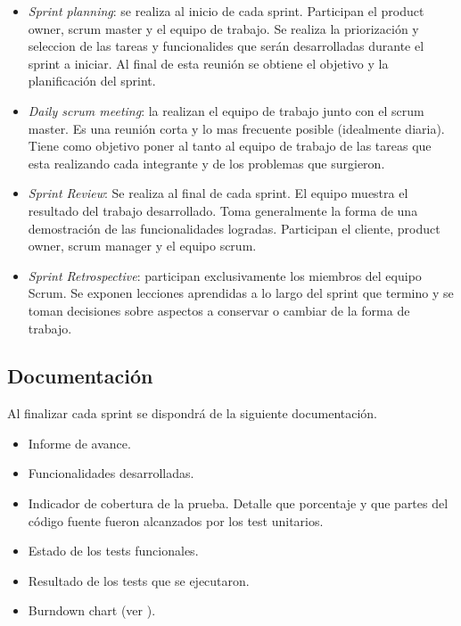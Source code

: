 \documentclass[12pt,a4paper]{article}
\begin{document}
	\begin{itemize}
	\item \textit{Sprint planning}: se realiza al inicio de cada sprint. Participan el product owner, scrum master y el equipo de trabajo. Se realiza la priorización y seleccion de las tareas y funcionalides que serán desarrolladas durante el sprint a iniciar. Al final de esta reunión se obtiene el objetivo y la planificación del sprint.

	\item \textit{Daily scrum meeting}: la realizan el equipo de trabajo junto con el scrum master. Es una reunión corta y lo mas frecuente posible (idealmente diaria).  Tiene como objetivo poner al tanto al equipo de trabajo de las tareas que esta realizando cada integrante y de los problemas que surgieron.

	\item \textit{Sprint Review}: Se realiza al final de cada sprint. El equipo muestra el resultado del trabajo desarrollado. Toma generalmente la forma de una demostración de las funcionalidades logradas. Participan el cliente, product owner, scrum manager y el equipo scrum.

	\item \textit{Sprint Retrospective}: participan exclusivamente los miembros del equipo Scrum. Se exponen lecciones aprendidas a lo largo del sprint que termino y se toman decisiones sobre aspectos a conservar o cambiar de la forma de trabajo.
	\end{itemize}


	\subsection{Documentación}
	Al finalizar cada sprint se dispondrá de la siguiente documentación.

	\begin{itemize}
		\item Informe de avance.
		\item Funcionalidades desarrolladas.
		\item Indicador de cobertura de la prueba. Detalle que porcentaje y que partes del código fuente fueron alcanzados por los test unitarios.
		\item Estado de los tests funcionales.
		\item Resultado de los tests que se ejecutaron.
		\item Burndown chart (ver \cite{burndown}).
	\end{itemize}
\end{document}
